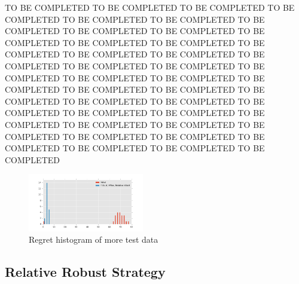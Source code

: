 \documentclass[13pt]{article}
\begin{document}
    TO BE COMPLETED TO BE COMPLETED TO BE COMPLETED TO BE COMPLETED TO BE COMPLETED TO BE COMPLETED TO BE COMPLETED TO BE COMPLETED TO BE COMPLETED TO BE COMPLETED TO BE COMPLETED TO BE COMPLETED TO BE COMPLETED TO BE COMPLETED TO BE COMPLETED TO BE COMPLETED TO BE COMPLETED TO BE COMPLETED TO BE COMPLETED TO BE COMPLETED TO BE COMPLETED TO BE COMPLETED TO BE COMPLETED TO BE COMPLETED TO BE COMPLETED TO BE COMPLETED TO BE COMPLETED TO BE COMPLETED TO BE COMPLETED TO BE COMPLETED TO BE COMPLETED TO BE COMPLETED TO BE COMPLETED TO BE COMPLETED TO BE COMPLETED TO BE COMPLETED TO BE COMPLETED TO BE COMPLETED TO BE COMPLETED TO BE COMPLETED 


    \begin{figure}
       \centering
       \includegraphics[width=0.45\textwidth]{regret.png}
        \caption{Regret histogram of more test data}
        \label{fig:regret}
    \end{figure}

\subsection{Relative Robust Strategy}
\end{document}
